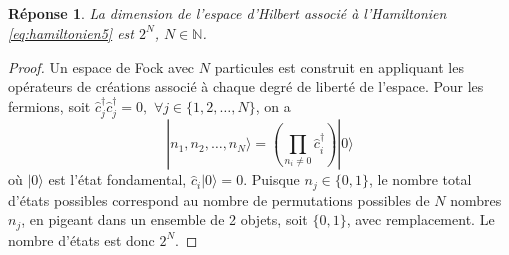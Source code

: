\documentclass{article}
\numberwithin{equation}{section}
\theoremstyle{solution}
\newtheorem{solution}{Réponse}[section]
\begin{document}
\subsection{}
\begin{solution}
La dimension de l'espace d'Hilbert associé à l'Hamiltonien \eqref{eq:hamiltonien5} est $2^{N}$, $N \in \mathbb{N}$. 
\end{solution}
\begin{proof}
Un espace de Fock avec $N$ particules est construit en appliquant les opérateurs de créations associé à chaque degré de liberté de l'espace. 
Pour les fermions, soit $\hat{c}^{\dagger}_j \hat{c}^{\dagger}_j = 0,\,\, \forall j \in \{1, 2, \dots, N\}$, on a
\begin{equation}
        | n_1, n_2, \dots, n_N \rangle = \left( \prod_{n_i \not= 0} \hat{c}_{i}^{\dagger}\right) | 0 \rangle
\end{equation} 
où $| 0 \rangle$ est l'état fondamental, $\hat{c}_i | 0 \rangle = 0$. 
Puisque $n_j \in \{0, 1\}$, le nombre total d'états possibles correspond au nombre de permutations possibles 
de $N$ nombres $n_j$, en pigeant dans un ensemble de 2 objets, soit $\{0, 1\}$, avec remplacement. Le nombre d'états est 
donc $2^{N}$.
\end{proof}
\end{document}
